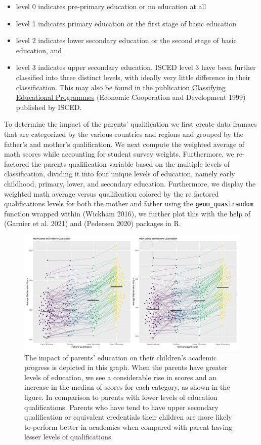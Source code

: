 \begin{itemize}
\tightlist
\item
  level 0 indicates pre-primary education or no education at all
\item
  level 1 indicates primary education or the first stage of basic education
\item
  level 2 indicates lower secondary education or the second stage of basic education, and
\item
  level 3 indicates upper secondary education. ISCED level 3 have been further classified into three distinct levels, with ideally very little difference in their classification. This may also be found in the publication \href{https://www.oecd.org/education/1841854.pdf}{Classifying Educational Programmes} (Economic Cooperation and Development 1999) published by ISCED.
\end{itemize}

To determine the impact of the parents' qualification we first create data framaes that are categorized by the various countries and regions and grouped by the father's and mother's qualification. We next compute the weighted average of math scores while accounting for student survey weights. Furthermore, we re-factored the parents qualification variable based on the multiple levels of classification, dividing it into four unique levels of education, namely early childhood, primary, lower, and secondary education. Furthermore, we display the weighted math average versus qualification colored by the re factored qualifications levels for both the mother and father using the \texttt{geom\_quasirandom} function wrapped within  (Wickham 2016), we further plot this with the help of  (Garnier et al. 2021) and  (Pedersen 2020) packages in R.

\begin{figure}[H]
\includegraphics[width=1\linewidth]{learningtower_files/figure-latex/qual-plot-1} \caption{The impact of parents' education on their children's academic progress is depicted in this graph. When the parents have greater levels of education, we see a considerable rise in scores and an increase in the median of scores for each category, as shown in the figure. In comparison to parents with lower levels of education qualifications. Parents who have tend to have upper secondary qualification or equivalent credentials their children are more likely to perform better in academics when compared with parent having lesser levels of qualifications.}\label{fig:qual-plot}
\end{figure}

